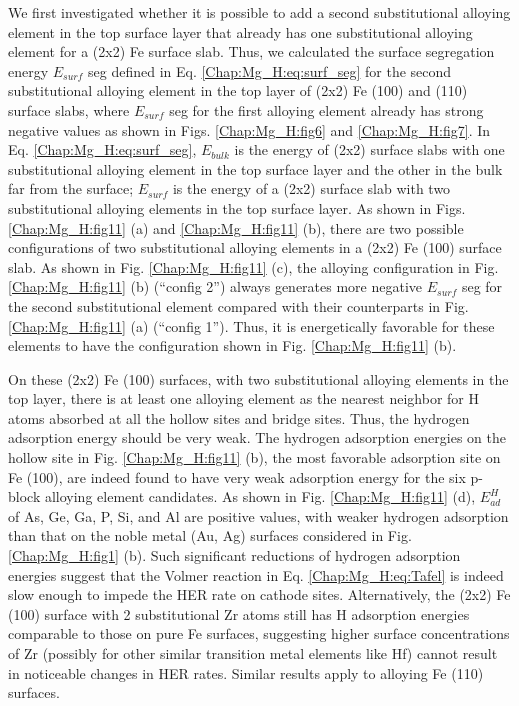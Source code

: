 We first investigated whether it is possible to add a second substitutional alloying element in the top surface layer that already has one substitutional alloying element for a (2x2) Fe surface slab. Thus, we calculated the surface segregation energy $E_{surf}$ seg defined in Eq. \ref{Chap:Mg_H:eq:surf_seg} for the second substitutional alloying element in the top layer of (2x2) Fe (100) and (110) surface slabs, where $E_{surf}$ seg for the first alloying element already has strong negative values as shown in Figs. \ref{Chap:Mg_H:fig6} and \ref{Chap:Mg_H:fig7}. In Eq. \ref{Chap:Mg_H:eq:surf_seg}, $E_{bulk}$ is the energy of (2x2) surface slabs with one substitutional alloying element in the top surface layer and the other in the bulk far from the surface; $E_{surf}$ is the energy of a (2x2) surface slab with two substitutional alloying elements in the top surface layer. As shown in Figs. \ref{Chap:Mg_H:fig11} (a) and \ref{Chap:Mg_H:fig11} (b), there are two possible configurations of two substitutional alloying elements in a (2x2) Fe (100) surface slab. As shown in Fig. \ref{Chap:Mg_H:fig11} (c), the alloying configuration in Fig. \ref{Chap:Mg_H:fig11} (b) (“config 2”) always generates more negative $E_{surf}$ seg for the second substitutional element compared with their counterparts in Fig. \ref{Chap:Mg_H:fig11} (a) (“config 1”). Thus, it is energetically favorable for these elements to have the configuration shown in Fig. \ref{Chap:Mg_H:fig11} (b).


On these (2x2) Fe (100) surfaces, with two substitutional alloying elements in the top layer, there is at least one alloying element as the nearest neighbor for H atoms absorbed at all the hollow sites and bridge sites. Thus, the hydrogen adsorption energy should be very weak. The hydrogen adsorption energies on the hollow site in Fig. \ref{Chap:Mg_H:fig11} (b), the most favorable adsorption site on Fe (100), are indeed found to have very weak adsorption energy for the six p-block alloying element candidates. As shown in Fig. \ref{Chap:Mg_H:fig11} (d), $E_{ad}^H$ of As, Ge, Ga, P, Si, and Al are positive values, with weaker hydrogen adsorption than that on the noble metal (Au, Ag) surfaces considered in Fig. \ref{Chap:Mg_H:fig1} (b). Such significant reductions of hydrogen adsorption energies suggest that the Volmer reaction in Eq. \ref{Chap:Mg_H:eq:Tafel} is indeed slow enough to impede the \ac{HER} rate on cathode sites. Alternatively, the (2x2) Fe (100) surface with 2 substitutional Zr atoms still has H adsorption energies comparable to those on pure Fe surfaces, suggesting higher surface concentrations of Zr (possibly for other similar transition metal elements like Hf) cannot result in noticeable changes in \ac{HER} rates. Similar results apply to alloying Fe (110) surfaces.


